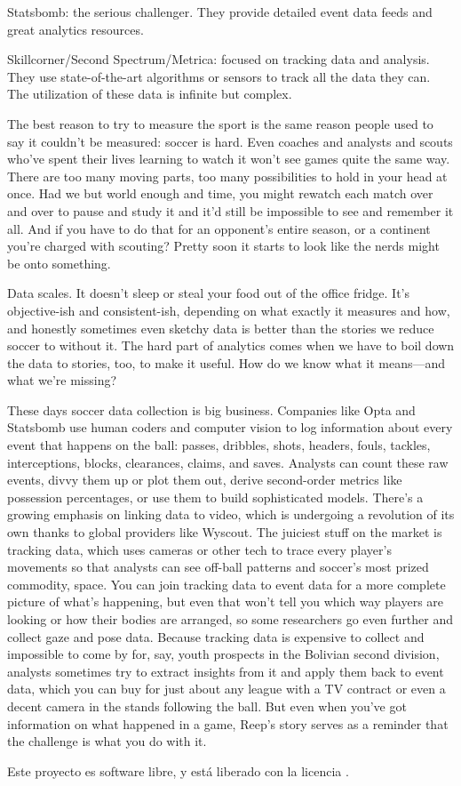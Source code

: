 Statsbomb: the serious challenger. They provide detailed event data feeds 
and great analytics resources.

Skillcorner/Second Spectrum/Metrica: focused on tracking data and analysis. 
They use state-of-the-art algorithms or sensors to track all the data they 
can. The utilization of these data is infinite but complex.


The best reason to try to measure the sport is the same reason people 
used to say it couldn’t be measured: soccer is hard. Even coaches and 
analysts and scouts who’ve spent their lives learning to watch it won’t 
see games quite the same way. There are too many moving parts, too many 
possibilities to hold in your head at once. Had we but world enough and 
time, you might rewatch each match over and over to pause and study it 
and it’d still be impossible to see and remember it all. And if you have 
to do that for an opponent’s entire season, or a continent you’re charged 
with scouting? Pretty soon it starts to look like the nerds might be onto 
something.

Data scales. It doesn’t sleep or steal your food out of the office fridge. 
It’s objective-ish and consistent-ish, depending on what exactly it measures 
and how, and honestly sometimes even sketchy data is better than the stories 
we reduce soccer to without it. The hard part of analytics comes when 
we have to boil down the data to stories, too, to make it useful. How do 
we know what it means—and what we’re missing?

These days soccer data collection is big business. Companies like Opta and 
Statsbomb use human coders and computer vision to log information about 
every event that happens on the ball: passes, dribbles, shots, headers, 
fouls, tackles, interceptions, blocks, clearances, claims, and saves. 
Analysts can count these raw events, divvy them up or plot them out, 
derive second-order metrics like possession percentages, or use them 
to build sophisticated models. There’s a growing emphasis on linking 
data to video, which is undergoing a revolution of its own thanks to 
global providers like Wyscout. The juiciest stuff on the market is 
tracking data, which uses cameras or other tech to trace every 
player’s movements so that analysts can see off-ball patterns 
and soccer’s most prized commodity, space. You can join tracking 
data to event data for a more complete picture of what’s happening, 
but even that won’t tell you which way players are looking or how 
their bodies are arranged, so some researchers go even further and 
collect gaze and pose data. Because tracking data is expensive to 
collect and impossible to come by for, say, youth prospects in the 
Bolivian second division, analysts sometimes try to extract insights 
from it and apply them back to event data, which you can buy for just 
about any league with a TV contract or even a decent camera in the 
stands following the ball. But even when you’ve got information on 
what happened in a game, Reep’s story serves as a reminder that 
the challenge is what you do with it.


Este proyecto es software libre, y está liberado con la licencia \cite{gplv3}.
